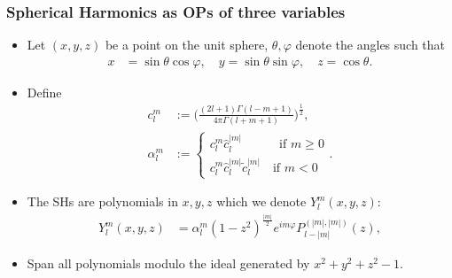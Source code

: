 \documentclass[10pt]{beamer}
\newcommand{\Ylm}{Y^m_l}
\newcommand{\costheta}{\cos\theta}
\newcommand{\sintheta}{\sin\theta}
\newcommand{\cosphi}{\cos\varphi}
\newcommand{\sinphi}{\sin\varphi}
\newcommand{\eimphi}{e^{im\varphi}}
\newcommand{\alphalm}{\alpha^m_l}
\newcommand{\clm}{c^m_l}
\newcommand{\ctildemod}{\tilde{c}^{|m|}_l}
\newcommand{\chatmod}{\hat{c}^{|m|}_l}
\begin{document}
\frame
{
    \frametitle{Spherical Harmonics as OPs of three variables}

\begin{itemize}

\item Let \((x,y,z)\) be a point on the unit sphere, \(\theta, \varphi\) denote the angles such that
\begin{align}
x &= \sintheta \cosphi, \quad y = \sintheta \sinphi, \quad z = \costheta.
\end{align}

\item Define
\begin{align}
\clm &:= \Bigg(\frac{(2l+1)\Gamma(l-m+1)}{4\pi\Gamma(l+m+1)}\Bigg)^\frac{1}{2}, \\
\alphalm &:= \begin{cases} 
		\clm \chatmod \quad \quad \quad \text{if } m \ge 0 \\
		\clm \chatmod \ctildemod \quad \text{if } m < 0
	   \end{cases}.
\end{align}

\item The SHs are polynomials in $x,y,z$ which we denote $\Ylm(x,y,z)$:
\begin{align}
\Ylm(x,y,z) &= \alphalm (1 - z^2)^\frac{|m|}{2} \eimphi P^{(|m|,|m|)}_{l-|m|}(z),
\end{align}

\item Span all polynomials modulo the ideal generated by $x^2 + y^2 + z^2 - 1$.

\end{itemize}

}
\end{document}
